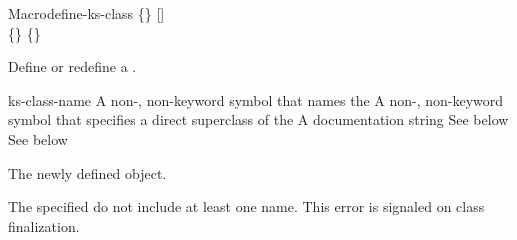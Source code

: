 \documentclass[10pt,twoside,english,pdftex]{article}
\begin{document}
\begin{functiondoc}{Macro}{define-ks-class}%
   { 
   \code{(}\{\}\superstar\code{)}
   [] \\
   \code{(}\{\}\superstar\code{)}
   \{\}\superstar{} \returns{}
   }
%
%
%

\fnsyntax

\fnpurpose Define or redefine a .

\fnpackage {}

\fnmodule {}

\fnargs
\begin{args}{ks-class-name}
 A non-\nil, non-keyword symbol that names the
 A non-\nil, non-keyword symbol that specifies a
direct superclass of the    
\arg[documentation] A documentation string
 See below
 See below
\end{args}

\fnreturns The newly defined  object.

\fnerrors The specified  do not include at least
one  name.  This error is signaled on class finalization.


\end{functiondoc}
\end{document}
